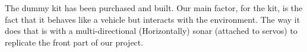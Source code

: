The dummy kit has been purchased and built. Our main factor, for the kit, is the fact that it behaves like a vehicle but interacts with the environment. The way it does that is with a multi-directional (Horizontally) sonar (attached to servos) to replicate the front part of our project.\par

